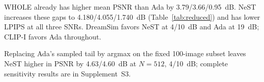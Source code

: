 WHOLE already has higher mean PSNR than Ada by 3.79/3.66/0.95~dB. NeST increases these gaps to 4.180/4.055/1.740~dB (Table~\ref{tab:reduced}) and has lower LPIPS at all three SNRs. DreamSim favors NeST at 4/10~dB and Ada at 19~dB; CLIP-I favors Ada throughout.

Replacing Ada's sampled tail by argmax on the fixed 100-image subset leaves NeST higher in PSNR by 4.63/4.60~dB at $N=512$, 4/10~dB; complete sensitivity results are in Supplement~S3.
